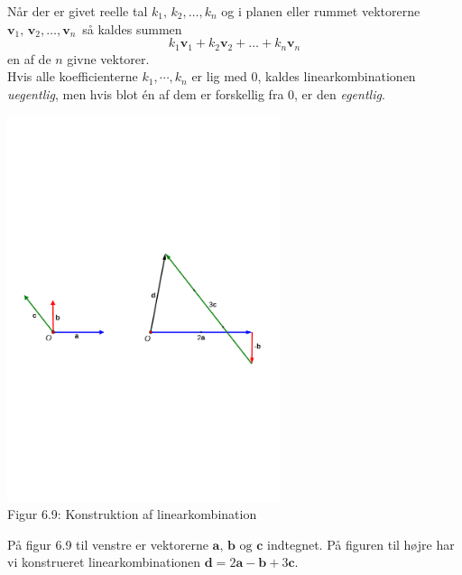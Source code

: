 \begin{definition}[Linearkombination]
Når der er givet reelle tal $k_1,\,k_2,\ldots,k_n$ og i planen eller rummet vektorerne ${\mathbf v}_1,\,{\mathbf v}_2,\ldots,{\mathbf v}_n\,$ så kaldes summen
$$k_1{\mathbf v}_1+k_2{\mathbf v}_2+\ldots+k_n{\mathbf v}_n$$
en  af de $n$ givne vektorer.\\

Hvis alle koefficienterne $k_1,\cdots , k_n$ er lig med 0, kaldes linearkombinationen \textit{uegentlig}, men hvis blot én af dem er forskellig fra 0, er den \textit{egentlig}.
\end{definition}
\begin{example}
\begin{center}
		\includegraphics[trim=1.4cm 10.5cm 1.4cm 10.7cm,width=0.60\textwidth,clip]{geometer/vektor6.pdf}	
		\\Figur 6.9: Konstruktion af linearkombination			
\end{center}
På figur 6.9 til venstre er vektorerne $\mathbf a,\,\mathbf b\,\,\mathrm{og}\,\,\mathbf{c}$ indtegnet. På figuren til højre har vi konstrueret linearkombinationen 
$\mathbf d=2\mathbf a-\mathbf b +3\mathbf{c}$.
\end{example}


